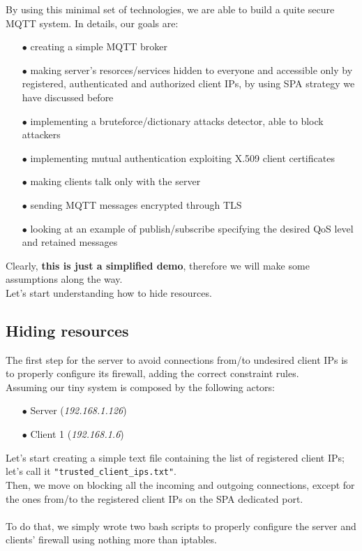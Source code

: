 \documentclass[12pt]{report}
\begin{document}
{By using this minimal set of technologies, we are able to build a quite secure MQTT system. In details, our goals are:\bigskip

\begin{itemize}
\setlength{\itemindent}{+4mm}
\item[$\bullet$] creating a simple MQTT broker
\item[$\bullet$] making server's resorces/services hidden to everyone and accessible only by registered, authenticated and authorized client IPs, by using SPA strategy we have discussed before
\item[$\bullet$] implementing a bruteforce/dictionary attacks detector, able to block attackers
\item[$\bullet$] implementing mutual authentication exploiting X.509 client certificates
\item[$\bullet$] making clients talk only with the server
\item[$\bullet$] sending MQTT messages encrypted through TLS
\item[$\bullet$] looking at an example of publish/subscribe specifying the desired QoS level and retained messages
\end{itemize}

Clearly, \textbf{this is just a simplified demo}, therefore we will make some assumptions along the way.\\

Let's start understanding how to hide resources.

\subsection{Hiding resources}
\bigskip
The first step for the server to avoid connections from/to undesired client IPs is to properly configure its firewall, adding the correct constraint rules.\\
Assuming our tiny system is composed by the following actors:
\bigskip
\begin{itemize}
\setlength{\itemindent}{+4mm}
\item[$\bullet$] Server (\emph{192.168.1.126})
\item[$\bullet$] Client 1 (\emph{192.168.1.6})\\
\end{itemize}

Let's start creating a simple text file containing the list of registered client IPs; let's call it \texttt{"trusted\_client\_ips.txt"}.\\
Then, we move on blocking all the incoming and outgoing connections, except for the ones from/to the registered client IPs on the SPA dedicated port.\\\\
To do that, we simply wrote two bash scripts to properly configure the server and clients' firewall using nothing more than iptables.

}
\end{document}
